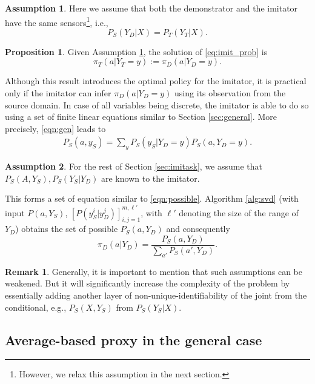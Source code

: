 \documentclass[letterpaper]{article} %
\theoremstyle{definition}%
\theoremstyle{definition}
\newtheorem{proposition}{Proposition}
\newtheorem{assumption}{Assumption} %
\newtheorem{remark}{Remark}
\newcommand{\Obs}{Y}
\newcommand{\obs}{y}
\begin{document}
\begin{assumption}\label{ass:im1}
Here we assume that both the demonstrator and the imitator have the same sensors\footnote{However, we relax this assumption in the next section.}, i.e.,
$$
P_S(\Obs_D|X) = P_T(\Obs_T|X).
$$
\end{assumption}
\begin{proposition}\label{pro:imi1}
Given Assumption \ref{ass:im1}, the solution of \eqref{eq:imit_prob} is
$$
\pi_T(a|\Obs_T=\obs) := \pi_D(a|\Obs_D=\obs).
$$
\end{proposition}
Although this result introduces the optimal policy for the imitator, it is practical only if the imitator can infer $\pi_D(a|\Obs_D=\obs)$ using its observation from the source domain.
In case of all variables being discrete, the imitator is able to do so using a set of finite linear equations similar to Section \ref{sec:general}. More precisely,
\eqref{eqn:gen} leads to
\begin{align}\label{eq:cons}
\!\! P_S(a, \obs_S)\! =\!\! \sum_\obs  P_S(\obs_S|\Obs_D=\obs)P_S(a,\Obs_D=\obs).
\end{align}
\begin{assumption}
For the rest of Section \ref{sec:imitask}, we assume that $P_S(A, \Obs_S), P_S(\Obs_S|\Obs_D)$ are known to the imitator.
\end{assumption}
This forms a set of equation similar to \eqref{eqn:possible}. Algorithm \ref{alg:svd} (with input $P(a, Y_S)$, $[P( y_S^i | y_D^j)]_{i,j=1}^{m, \ell'}$, with $\ell'$ denoting the size of the range of $Y_D$) obtains the set of possible $P_S(a,\Obs_D)$ and consequently
$$
\pi_D(a|\Obs_D)= \frac{P_S(a,\Obs_D)}{\sum_{a'}P_S(a',\Obs_D)}.
$$
\begin{remark}
Generally, it is important to mention that such assumptions can be weakened. But it will significantly increase the complexity of the problem by  essentially adding another layer of non-unique-identifiability of the joint from the conditional, e.g., $P_S(X, Y_S)$ from $P_S(Y_S|X)$.
\end{remark}

\subsection{Average-based proxy in the general case}
\label{sec:imav}
\end{document}
